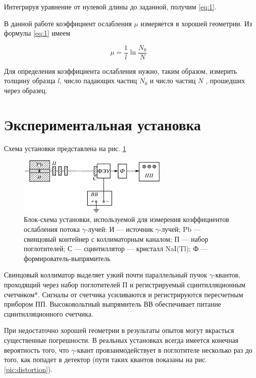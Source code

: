 \documentclass[a4paper,12pt]{article}
\begin{document}
Интегрируя уравнение от нулевой длины до заданной, получим \eqref{eq:1}.


В данной работе коэффициент ослабления $\mu$ измеряется в хорошей геометрии. Из формулы \eqref{eq:1} имеем

\begin{equation}\label{eq:9}
    \mu = \frac{1}{l} \ln{\frac{N_0}{N}}
\end{equation}

Для определения коэффициента ослабления нужно, таким образом, измерить толщину образца $l$, число падающих частиц $N_0$ и число частиц $N$ , прошедших через образец.

\section{Экспериментальная установка}

Схема установки представлена на рис. \ref{pic:ustan}

\begin{figure}[h]
    \begin{center}
        \includegraphics[width = 0.65\textwidth]{pictures/ustan.png}
        \caption{Блок-схема установки, используемой для измерения коэффициентов ослабления потока $\gamma$-лучей: И — источник $\gamma$-лучей; Pb — свинцовый контейнер с коллиматорным каналом; П — набор поглотителей; С — сцинтиллятор — кристалл NaI(Tl); Ф — формирователь-выпрямитель}
    \label{pic:ustan}
    \end{center}
\end{figure}

Свинцовый коллиматор выделяет узкий почти параллельный пучок $\gamma$-квантов, проходящий через набор поглотителей П и регистрируемый сцинтилляционным счетчиком*. Сигналы от счетчика усиливаются и регистрируются пересчетным прибором ПП. Высоковольтный выпрямитель ВВ обеспечивает питание сцинтилляционного счетчика.

При недостаточно хорошей геометрии в результаты опытов могут вкрасться существенные погрешности. В реальных установках всегда имеется конечная вероятность того, что $\gamma$-квант провзаимодействует в поглотителе несколько раз до того, как попадет в детектор (пути таких квантов показаны на рис. \ref{pic:distortion}).
\end{document}
